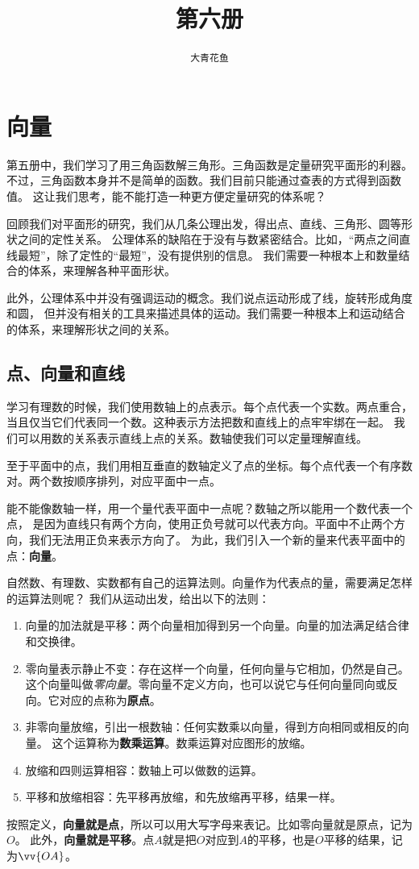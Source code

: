 \documentclass[12pt,UTF8]{ctexbook}
\title{\zihao{0} \bfseries 第六册}
\author{\zihao{2} \texttt{大青花鱼}}
\date{}
\begin{document}
\maketitle
\tableofcontents
\newpage

\chapter{向量}
第五册中，我们学习了用三角函数解三角形。三角函数是定量研究平面形的利器。
不过，三角函数本身并不是简单的函数。我们目前只能通过查表的方式得到函数值。
这让我们思考，能不能打造一种更方便定量研究的体系呢？ 

回顾我们对平面形的研究，我们从几条公理出发，得出点、直线、三角形、圆等形状之间的定性关系。
公理体系的缺陷在于没有与数紧密结合。比如，“两点之间直线最短”，除了定性的“最短”，没有提供别的信息。
我们需要一种根本上和数量结合的体系，来理解各种平面形状。

此外，公理体系中并没有强调运动的概念。我们说点运动形成了线，旋转形成角度和圆，
但并没有相关的工具来描述具体的运动。我们需要一种根本上和运动结合的体系，来理解形状之间的关系。

\section{点、向量和直线}
学习有理数的时候，我们使用数轴上的点表示。每个点代表一个实数。两点重合，
当且仅当它们代表同一个数。这种表示方法把数和直线上的点牢牢绑在一起。
我们可以用数的关系表示直线上点的关系。数轴使我们可以定量理解直线。

至于平面中的点，我们用相互垂直的数轴定义了点的坐标。每个点代表一个有序数对。两个数按顺序排列，对应平面中一点。

能不能像数轴一样，用一个量代表平面中一点呢？数轴之所以能用一个数代表一个点，
是因为直线只有两个方向，使用正负号就可以代表方向。平面中不止两个方向，我们无法用正负来表示方向了。
为此，我们引入一个新的量来代表平面中的点：\textbf{向量}。

自然数、有理数、实数都有自己的运算法则。向量作为代表点的量，需要满足怎样的运算法则呢？
我们从运动出发，给出以下的法则：
\begin{enumerate}
    \item 向量的加法就是平移：两个向量相加得到另一个向量。向量的加法满足结合律和交换律。
    \item 零向量表示静止不变：存在这样一个向量，任何向量与它相加，仍然是自己。
    这个向量叫做\textsl{零向量}。零向量不定义方向，也可以说它与任何向量同向或反向。它对应的点称为\textbf{原点}。
    \item 非零向量放缩，引出一根数轴：任何实数乘以向量，得到方向相同或相反的向量。
    这个运算称为\textbf{数乘运算}。数乘运算对应图形的放缩。
    \item 放缩和四则运算相容：数轴上可以做数的运算。
    \item 平移和放缩相容：先平移再放缩，和先放缩再平移，结果一样。
\end{enumerate}
按照定义，\textbf{向量就是点}，所以可以用大写字母来表记。比如零向量就是原点，记为$O$。
此外，\textbf{向量就是平移}。点$A$就是把$O$对应到$A$的平移，也是$O$平移的结果，记为$\vv{OA}$。
\end{document}

